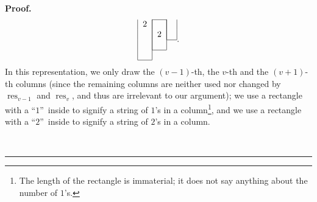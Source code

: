\documentclass[numbers=enddot,12pt,final,onecolumn,notitlepage]{scrartcl}%
\theoremstyle{definition}
\newenvironment{proof}[1][Proof]{\noindent\textbf{#1.} }{\ \rule{0.5em}{0.5em}}
\newenvironment{vershort}{}{}
\begin{document}
\begin{vershort}
\begin{proof}
\begin{equation}
\begin{tabular}{ccc}
\cline{2-2} \multicolumn{1}{|c|}{2} & \multicolumn{1}{|c|}{} & \multicolumn
{1}{|c|}{} \\
\multicolumn{1}{|c|}{} & \multicolumn{1}{|c|}{2} & \multicolumn{1}{|c|}{} \\
\cline{3-3} \multicolumn{1}{|c|}{} & \multicolumn{1}{|c|}{} \\
\cline{2-2} \multicolumn{1}{|c|}{} \\
\cline{1-1}
\end{tabular}%
. \label{pf.prop.conflict-resolution.hyps.short.A}%
\end{equation}
In this representation, we only draw the $\left(  v-1\right)  $-th, the $v$-th
and the $\left(  v+1\right)  $-th columns (since the remaining columns are
neither used nor changed by $\operatorname*{res}\nolimits_{v-1}$ and
$\operatorname*{res}\nolimits_{v}$, and thus are irrelevant to our argument);
we use a rectangle with a \textquotedblleft$1$\textquotedblright\ inside to
signify a string of $1$'s in a column\footnote{The length of the rectangle is
immaterial; it does not say anything about the number of $1$'s.}, and we use a
rectangle with a \textquotedblleft$2$\textquotedblright\ inside to signify a
string of $2$'s in a column.


\end{proof}
\end{vershort}
\end{document}
